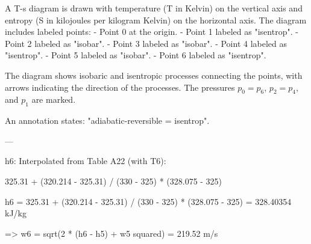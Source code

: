 A T-s diagram is drawn with temperature (T in Kelvin) on the vertical axis and entropy (S in kilojoules per kilogram Kelvin) on the horizontal axis. The diagram includes labeled points:  
- Point 0 at the origin.  
- Point 1 labeled as "isentrop".  
- Point 2 labeled as "isobar".  
- Point 3 labeled as "isobar".  
- Point 4 labeled as "isentrop".  
- Point 5 labeled as "isobar".  
- Point 6 labeled as "isentrop".  

The diagram shows isobaric and isentropic processes connecting the points, with arrows indicating the direction of the processes. The pressures \( p_0 = p_6 \), \( p_2 = p_4 \), and \( p_1 \) are marked.  

An annotation states: "adiabatic-reversible = isentrop".  

---

h6: Interpolated from Table A22 (with T6):  

325.31 + (320.214 - 325.31) / (330 - 325) * (328.075 - 325)  

h6 = 325.31 + (320.214 - 325.31) / (330 - 325) * (328.075 - 325)  
= 328.40354 kJ/kg  

=> w6 = sqrt(2 * (h6 - h5) + w5 squared) = 219.52 m/s